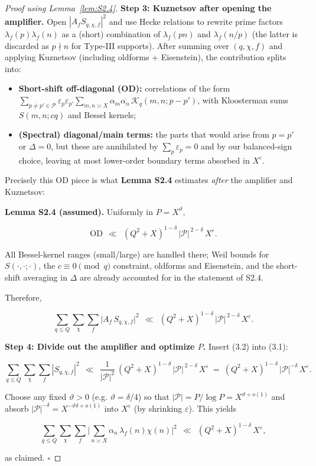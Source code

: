\documentclass[11pt]{article}
\theoremstyle{definition}
\theoremstyle{remark}
\begin{document}
\begin{proof}[Proof using Lemma~\ref{lem:S2.4}]
	\noindent\textbf{Step 3: Kuznetsov after opening the amplifier.}
	Open $|A_f S_{q,\chi,f}|^2$ and use Hecke relations to rewrite prime factors $\lambda_f(p)\lambda_f(n)$ as a (short) combination of $\lambda_f(pn)$ and $\lambda_f(n/p)$ (the latter is discarded as $p\nmid n$ for Type-III supports). After summing over $(q,\chi,f)$ and applying Kuznetsov (including oldforms + Eisenstein), the contribution splits into:

	\begin{itemize}
		\item \textbf{Short-shift off-diagonal (OD):} correlations of the form
		      $\sum_{p\neq p'\in\mathcal P}\varepsilon_p\varepsilon_{p'}\sum_{m,n\asymp X}\alpha_m\overline{\alpha_n}\, \mathcal{K}_{q}(m, n; p-p')$,
		      with Kloosterman sums $S(m,n;cq)$ and Bessel kernels;
		\item \textbf{(Spectral) diagonal/main terms:} the parts that would arise from $p=p'$ or $\Delta=0$, but these are annihilated by $\sum_p\varepsilon_p=0$ and by our balanced-sign choice, leaving at most lower-order boundary terms absorbed in $X^{\varepsilon}$.
	\end{itemize}

	Precisely this OD piece is what \textbf{Lemma S2.4} estimates \emph{after} the amplifier and Kuznetsov:

	\noindent\textbf{Lemma S2.4 (assumed).} Uniformly in $P=X^\vartheta$,

	$$
		\mathrm{OD}\ \ \ll\ \ (Q^2+X)^{1-\delta}\,|\mathcal P|^{\,2-\delta}\,X^{\varepsilon}.
	$$

	All Bessel-kernel ranges (small/large) are handled there; Weil bounds for $S(\cdot,\cdot;\cdot)$, the $c\equiv0\pmod q$ constraint, oldforms and Eisenstein, and the short-shift averaging in $\Delta$ are already accounted for in the statement of S2.4.

	Therefore,

	\begin{equation}
		\sum_{q\le Q}\sum_{\chi}\sum_f \big|A_f\,S_{q,\chi,f}\big|^2
		\ \ \ll\ \ (Q^2+X)^{1-\delta}\,|\mathcal P|^{\,2-\delta}\,X^{\varepsilon}.
		\tag{3.2}
	\end{equation}


	\noindent\textbf{Step 4: Divide out the amplifier and optimize $P$.}
	Insert (3.2) into (3.1):

	$$
		\sum_{q\le Q}\sum_{\chi}\sum_f |S_{q,\chi,f}|^2
		\ \ \ll\ \ \frac{1}{|\mathcal P|^2}\ (Q^2+X)^{1-\delta}\,|\mathcal P|^{\,2-\delta}\,X^{\varepsilon}
		\ =\ (Q^2+X)^{1-\delta}\,|\mathcal P|^{-\delta}\,X^{\varepsilon}.
	$$

	Choose any fixed $\vartheta>0$ (e.g. $\vartheta=\delta/4$) so that $|\mathcal P|=P/\log P=X^{\vartheta+o(1)}$ and absorb $|\mathcal P|^{-\delta}=X^{-\vartheta\delta+o(1)}$ into $X^{\varepsilon}$ (by shrinking $\varepsilon$). This yields

	$$
		\sum_{q\le Q}\sum_{\chi}\sum_f \Big|\sum_{n\asymp X}\alpha_n\,\lambda_f(n)\chi(n)\Big|^2
		\ \ \ll\ \ (Q^2+X)^{1-\delta}\,X^{\varepsilon},
	$$

	as claimed. $\square$

\end{proof}
\end{document}
